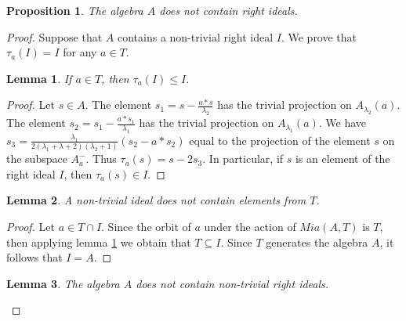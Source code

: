 \documentclass[12pt]{article}
\newcommand\lm{\lambda}
\newtheorem{lem}{Lemma}
\newtheorem{prop}{Proposition}
\begin{document}
\begin{prop}\label{noideal}
	The algebra $A$ does not contain right ideals.
\end{prop}
\begin{proof}
	
	Suppose that $A$ contains a non-trivial right ideal $I$. We prove that $\tau_a(I)=I$ for any $a\in T$.
	
	\begin{lem}\label{orb}
	If $a\in T$, then $\tau_a(I)\leq I$.
	\end{lem}
	\begin{proof}
		 Let $s\in A$. The element $s_1=s-\frac{a*s}{\lm_2}$ has the trivial projection on $A_{\lm_2}(a)$. The element $s_2=s_1-\frac{a*s_1}{\lm_1}$ has the trivial projection on $A_{\lm_1}(a)$. We have $s_3=\frac{\lm_1}{2(\lm_1+\lm+2)(\lm_2+1)}(s_2-a*s_2)$ equal to the projection of the element $s$ on the subspace $A_a^-$. Thus $\tau_a(s)=s-2s_3$. In particular, if $s$ is an element of the right ideal $I$, then $\tau_a(s)\in I$. 		
	\end{proof}
	\begin{lem}\label{IdAx}
		A non-trivial ideal does not contain elements from $T$.
	\end{lem}
	\begin{proof}
Let $a\in T\cap I$. Since the orbit of $a$ under the action of $Mia(A,T)$ is $T$, then applying lemma \ref{orb} we obtain that $T\subseteq I$. Since $T$ generates the algebra $A$, it follows that $I=A$.	
\end{proof}
	\begin{lem}\label{fin}
The algebra $A$ does not contain non-trivial right ideals.         


\end{lem}
\end{proof}
\end{document}

